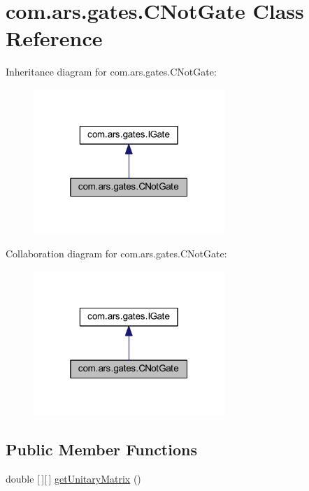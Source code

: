 \hypertarget{classcom_1_1ars_1_1gates_1_1_c_not_gate}{}\section{com.\+ars.\+gates.\+C\+Not\+Gate Class Reference}
\label{classcom_1_1ars_1_1gates_1_1_c_not_gate}


Inheritance diagram for com.\+ars.\+gates.\+C\+Not\+Gate\+:\nopagebreak
\begin{figure}[H]
\begin{center}
\leavevmode
\includegraphics[width=205pt]{classcom_1_1ars_1_1gates_1_1_c_not_gate__inherit__graph}
\end{center}
\end{figure}


Collaboration diagram for com.\+ars.\+gates.\+C\+Not\+Gate\+:\nopagebreak
\begin{figure}[H]
\begin{center}
\leavevmode
\includegraphics[width=205pt]{classcom_1_1ars_1_1gates_1_1_c_not_gate__coll__graph}
\end{center}
\end{figure}
\subsection*{Public Member Functions}
\begin{DoxyCompactItemize}
\item 
double \mbox{[}$\,$\mbox{]}\mbox{[}$\,$\mbox{]} \hyperlink{classcom_1_1ars_1_1gates_1_1_c_not_gate_a3a78f3ef3d7a418a51b3fabc46954ec5}{get\+Unitary\+Matrix} ()
\end{DoxyCompactItemize}


